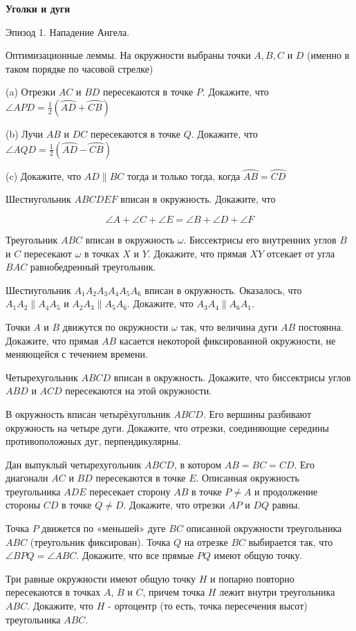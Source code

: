\centerline{\bf \Huge Уголки и дуги}

\begin{flushright}
        \scriptsize{Эпизод 1. Нападение Ангела.}
\end{flushright}

Оптимизационные леммы. На окружности выбраны точки $A, B, C$ и $D$ (именно в таком порядке по часовой стрелке)

(a) Отрезки $A C$ и $B D$ пересекаются в точке $P$. Докажите, что $\angle A P D=\frac{1}{2}(\overparen{A D}+\overparen{C B})$

(b) Лучи $A B$ и $D C$ пересекаются в точке $Q$. Докажите, что $\angle A Q D=\frac{1}{2}(\overparen{A D}-\overparen{C B})$

(c) Докажите, что $A D \| B C$ тогда и только тогда, когда $\overparen{A B}=\overparen{C D}$

Шестиугольник $A B C D E F$ вписан в окружность. Докажите, что

$$
\angle A+\angle C+\angle E=\angle B+\angle D+\angle F
$$

Треугольник $A B C$ вписан в окружность $\omega$. Биссектрисы его внутренних углов $B$ и $C$ пересекают $\omega$ в точках $X$ и $Y$. Докажите, что прямая $X Y$ отсекает от угла $B A C$ равнобедренный треугольник.

Шестиугольник $A_1 A_2 A_3 A_4 A_5 A_6$ вписан в окружность. Оказалось, что $A_1 A_2 \| A_4 A_5$ и $A_2 A_3 \| A_5 A_6$. Докажите, что $A_3 A_4 \| A_6 A_1$.

Точки $A$ и $B$ движутся по окружности $\omega$ так, что величина дуги $A B$ постоянна. Докажите, что прямая $A B$ касается некоторой фиксированной окружности, не меняющейся с течением времени.

Четырехугольник $A B C D$ вписан в окружность. Докажите, что биссектрисы углов $A B D$ и $A C D$ пересекаются на этой окружности.

В окружность вписан четырёхугольник $ABCD$. Его вершины разбивают окружность на четыре дуги. Докажите, что отрезки, соединяющие середины противоположных дуг, перпендикулярны.

Дан выпуклый четырехугольник $ABCD$, в котором $AB=BC=CD$. Его диагонали $A C$ и $BD$ пересекаются в точке $E$. Описанная окружность треугольника $A D E$ пересекает сторону $A B$ в точке $P \neq A$ и продолжение стороны $C D$ в точке $Q \neq D$. Докажите, что отрезки $A P$ и $D Q$ равны.

Точка $P$ движется по «меньшей» дуге $B C$ описанной окружности треугольника $A B C$ (треугольник фиксирован). Точка $Q$ на отрезке $B C$ выбирается так, что $\angle B P Q=\angle A B C$. Докажите, что все прямые $P Q$ имеют общую точку.

Три равные окружности имеют общую точку $H$ и попарно повторно пересекаются в точках $A$, $B$ и $C$, причем точка $H$ лежит внутри треугольника $A B C$. Докажите, что $H$ - ортоцентр (то есть, точка пересечения высот) треугольника $A B C$.